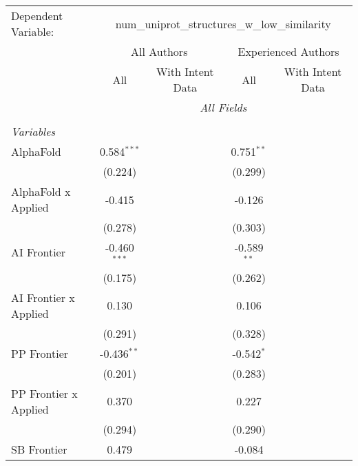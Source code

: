 \begingroup
\centering
\begin{tabular}{lcccccc}
   \tabularnewline \midrule \midrule
   Dependent Variable: & \multicolumn{6}{c}{num\_uniprot\_structures\_w\_low\_similarity}\\
 & \multicolumn{3}{c}{All Authors} & \multicolumn{3}{c}{Experienced Authors} \\
\cmidrule(lr){2-4} \cmidrule(lr){5-7}
 & \multicolumn{1}{c}{All} & \multicolumn{2}{c}{With Intent Data} & \multicolumn{1}{c}{All} & \multicolumn{2}{c}{With Intent Data} \\
\cmidrule(lr){2-2} \cmidrule(lr){3-4} \cmidrule(lr){5-5} \cmidrule(lr){6-7}
 & \multicolumn{6}{c}{\textit{All Fields}} \\ \\
   \emph{Variables}\\
   AlphaFold             & 0.584$^{***}$  &         &         & 0.751$^{**}$  &        &   \\   
                         & (0.224)        &         &         & (0.299)       &        &   \\   
   AlphaFold x Applied   & -0.415         &         &         & -0.126        &        &   \\   
                         & (0.278)        &         &         & (0.303)       &        &   \\   
   AI Frontier           & -0.460$^{***}$ &         &         & -0.589$^{**}$ &        &   \\   
                         & (0.175)        &         &         & (0.262)       &        &   \\   
   AI Frontier x Applied & 0.130          &         &         & 0.106         &        &   \\   
                         & (0.291)        &         &         & (0.328)       &        &   \\   
   PP Frontier           & -0.436$^{**}$  &         &         & -0.542$^{*}$  &        &   \\   
                         & (0.201)        &         &         & (0.283)       &        &   \\   
   PP Frontier x Applied & 0.370          &         &         & 0.227         &        &   \\   
                         & (0.294)        &         &         & (0.290)       &        &   \\   
   SB Frontier           & 0.479          &         &         & -0.084        &        &   \\   

\end{tabular}
